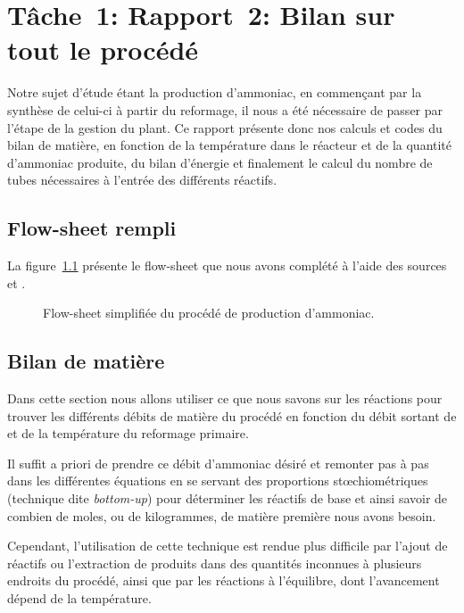 \chapter{Tâche~1: Rapport~2: Bilan sur tout le procédé}

Notre sujet d'étude étant la production d’ammoniac, en commençant par la synthèse de celui-ci à partir du reformage, il nous a été nécessaire de passer par l’étape de la gestion du plant. Ce rapport présente donc nos calculs et codes \matlab{} du bilan de matière, en fonction de la température dans le réacteur et de la quantité d’ammoniac produite, du bilan d’énergie et finalement le calcul du nombre de tubes nécessaires à l’entrée des différents réactifs. 

\section{Flow-sheet rempli}

La figure~\ref{fig:flowsheet2} présente le flow-sheet que nous avons complété à l'aide des sources \cite{epa} et \cite{process-patent}.

\begin{figure}
    \centering
    
    \caption{Flow-sheet simplifiée du procédé de production d'ammoniac.}
    \label{fig:flowsheet2}
\end{figure}
%    

\section{Bilan de matière}

Dans cette section nous allons utiliser ce que nous savons
sur les réactions pour trouver les différents débits de matière du procédé
en fonction du débit sortant de 
et de la température du reformage primaire.

Il suffit a priori de prendre ce débit
d’ammoniac désiré et remonter pas à pas
dans les différentes équations en se servant des proportions stœchiométriques
(technique dite \emph{bottom-up})
pour déterminer les réactifs de base
et ainsi savoir de combien de moles, ou de kilogrammes, de matière première
nous avons besoin.

Cependant, l'utilisation de cette technique est rendue plus difficile par
l'ajout de réactifs ou l'extraction de produits dans des quantités inconnues
à plusieurs endroits du procédé, ainsi que par les réactions à l'équilibre,
dont l'avancement dépend de la température.

